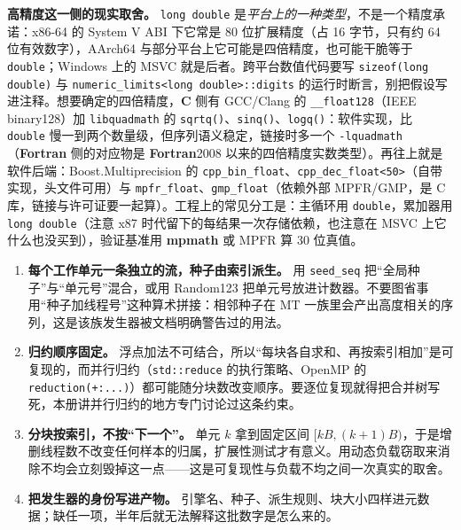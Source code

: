 \documentclass[12pt,a4paper,fontset=fandol]{ctexbook}
\newcommand{\Fn}[1]{\texttt{#1()}}
\newcommand{\Tp}[1]{\texttt{#1}}
\newcommand{\Bk}{\allowbreak}
\newcommand{\Lib}[1]{\textbf{#1}}
\newcommand{\Lang}[1]{\textsf{\bfseries #1}}
\newcommand{\CL}{\Lang{C}}
\newcommand{\FTN}{\Lang{Fortran}}
\begin{document}
\textbf{高精度这一侧的现实取舍。} \Tp{long double} 是\emph{平台上的一种类型}，不是一个精度承诺：x86-64 的 System V ABI 下它常是 80 位扩展精度（占 16 字节，只有约 64 位有效数字），AArch64 与部分平台上它可能是四倍精度，也可能干脆等于 \Tp{double}；Windows 上的 MSVC 就是后者。跨平台数值代码要写 \Tp{sizeof(long double)} 与 \Tp{numeric\_limits<long\Bk{} double>::digits} 的运行时断言，别把假设写进注释。想要确定的四倍精度，\CL{} 侧有 GCC/Clang 的 \Tp{\_\_float128}（IEEE binary128）加 \Tp{libquadmath} 的 \Fn{sqrtq}、\Fn{sinq}、\Fn{logq}：软件实现，比 \Tp{double} 慢一到两个数量级，但序列语义稳定，链接时多一个 \Tp{-lquadmath}（\FTN{} 侧的对应物是 \FTN{}2008 以来的四倍精度实数类型）。再往上就是软件后端：Boost.Multiprecision 的 \Tp{cpp\_bin\_float}、\Tp{cpp\_dec\_float<50>}（自带实现，头文件可用）与 \Tp{mpfr\_float}、\Tp{gmp\_float}（依赖外部 MPFR/GMP，是 C 库，链接与许可证要一起算）。工程上的常见分工是：主循环用 \Tp{double}，累加器用 \Tp{long double}（注意 x87 时代留下的每结果一次存储依赖，也注意在 MSVC 上它什么也没买到），验证基准用 \Lib{mpmath} 或 MPFR 算 30 位真值。

\begin{bestpractice}[title={可复现蒙特卡洛的四条纪律}]
\begin{enumerate}
\item \textbf{每个工作单元一条独立的流，种子由索引派生。} 用 \Tp{seed\_seq} 把``全局种子''与``单元号''混合，或用 Random123 把单元号放进计数器。不要图省事用``种子加线程号''这种算术拼接：相邻种子在 MT 一族里会产出高度相关的序列，这是该族发生器被文档明确警告过的用法。
\item \textbf{归约顺序固定。} 浮点加法不可结合，所以``每块各自求和、再按索引相加''是可复现的，而并行归约（\Tp{std::reduce} 的执行策略、OpenMP 的 \Tp{reduction(+:...)}）都可能随分块数改变顺序。要逐位复现就得把合并树写死，本册讲并行归约的地方专门讨论过这条约束。
\item \textbf{分块按索引，不按``下一个''。} 单元 $k$ 拿到固定区间 $[kB,(k+1)B)$，于是增删线程数不改变任何样本的归属，扩展性测试才有意义。用动态负载窃取来消除不均会立刻毁掉这一点——这是可复现性与负载不均之间一次真实的取舍。
\item \textbf{把发生器的身份写进产物。} 引擎名、种子、派生规则、块大小四样进元数据；缺任一项，半年后就无法解释这批数字是怎么来的。
\end{enumerate}
\end{bestpractice}
\end{document}
